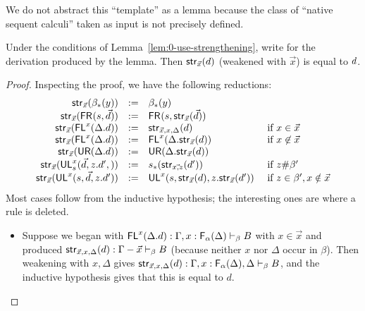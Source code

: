 We do not abstract this ``template'' as a lemma because the class of
``native sequent calculi'' taken as input is not precisely
defined.  

\begin{lemma} \label{lem:0-use-strengthening-eq}
Under the conditions of Lemma~\ref{lem:0-use-strengthening}, write
 for the derivation produced by the lemma.  Then
$\mathsf{str}_{\vec{x}}(d)$ (weakened with $\vec{x}$) is equal to $d$.  
\end{lemma}
\begin{proof}
Inspecting the proof, we have the following reductions:
\[
\begin{array}{rcll}
\mathsf{str}_{\vec{x}}(\beta_*(y)) & := & {\beta_*(y)}\\
\mathsf{str}_{\vec{x}}(\mathsf{FR}_{}(s,\vec{d})) & := & \mathsf{FR}_{}(s,\mathsf{str}_{\vec{x}}(\vec{d}))\\
\mathsf{str}_{\vec{x}}(\mathsf{FL}^{x}(\Delta.d)) & := & \mathsf{str}_{\vec{x},x,\Delta}(d) & \text{ if } x \in \vec{x}\\
\mathsf{str}_{\vec{x}}(\mathsf{FL}^{x}(\Delta.d)) & := & \mathsf{FL}^{x}(\Delta.\mathsf{str}_{\vec{x}}(d)) & \text{ if } x \not\in \vec{x}\\
\mathsf{str}_{\vec{x}}(\mathsf{UR}(\Delta.d)) & := & \mathsf{UR}(\Delta.\mathsf{str}_{\vec{x}}(d))\\
\mathsf{str}_{\vec{x}}(\mathsf{UL}^{x}_{s}(\vec{d},z.d',)) & := & s_*(\mathsf{str}_{\vec{x,z}}(d')) & \text{ if } z \# \beta'\\
\mathsf{str}_{\vec{x}}(\mathsf{UL}^{x}_{}(s,\vec{d},z.d')) & := & \mathsf{UL}^{x}_{}(s,\mathsf{str}_{\vec{x}}(d),z.\mathsf{str}_{\vec{x}}(d')) & \text{ if } z \in \beta', x \notin \vec{x}\\
\end{array}
\]
Most cases follow from the inductive hypothesis; the interesting ones
are where a rule is deleted.  

\begin{itemize}

\item Suppose we began with $\mathsf{FL}^{x}(\Delta.d) :
  \Gamma,x:\mathsf{F}_{\alpha}(\Delta) \vdash_{\beta} B$ with $x \in \vec{x}$ and
  produced $\mathsf{str}_{\vec{x},x,\Delta}(d) : \Gamma-\vec{x} \vdash_{\beta} B$
  (because neither $x$ nor $\Delta$ occur in $\beta$).  Then weakening
  with $x,\Delta$ gives $\mathsf{str}_{\vec{x},x,\Delta}(d) :
  \Gamma,x:\mathsf{F}_{\alpha}(\Delta),\Delta \vdash_{\beta} B$, and the inductive
  hypothesis gives that this is equal to $d$.  


\end{itemize}
\end{proof}
